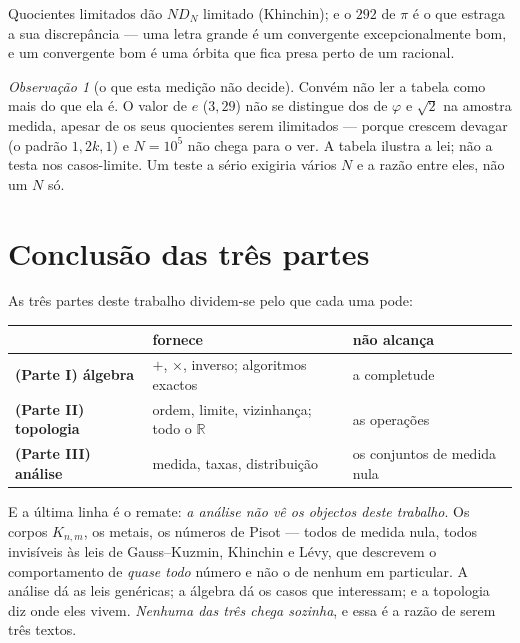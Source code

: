 \documentclass[11pt,a4paper]{article}
\theoremstyle{plain}
\theoremstyle{definition}
\theoremstyle{remark}
\newtheorem{obs}[teorema]{Observação}
\newcommand{\R}{\mathbb{R}}
\begin{document}
\noindent Quocientes limitados dão $N D_N$ limitado (Khinchin); e o $292$ de $\pi$ é o que estraga a
sua discrepância --- uma letra grande é um convergente excepcionalmente bom, e um convergente bom é
uma órbita que fica presa perto de um racional.

\begin{obs}[o que esta medição não decide]\label{obs:naodecide}
Convém não ler a tabela como mais do que ela é. O valor de $e$ ($3{,}29$) não se distingue dos de
$\varphi$ e $\sqrt2$ na amostra medida, apesar de os seus quocientes serem ilimitados --- porque
crescem devagar (o padrão $1,2k,1$) e $N=10^5$ não chega para o ver. A tabela ilustra a lei; não a
testa nos casos-limite. Um teste a sério exigiria vários $N$ e a razão entre eles, não um $N$ só.
\end{obs}

\section{Conclusão das três partes}\label{sec:conc3}

As três partes deste trabalho dividem-se pelo que cada uma pode:

\begin{center}\small
\begin{tabular}{lll}
\hline
& fornece & não alcança \\ \hline
\textbf{(Parte I) álgebra} & $+$, $\times$, inverso; algoritmos exactos & a completude \\
\textbf{(Parte II) topologia} & ordem, limite, vizinhança; todo o $\R$ & as operações \\
\textbf{(Parte III) análise} & medida, taxas, distribuição & os conjuntos de medida nula \\
\hline
\end{tabular}
\end{center}

\noindent E a última linha é o remate: \emph{a análise não vê os objectos deste trabalho}. Os
corpos $K_{n,m}$, os metais, os números de Pisot --- todos de medida nula, todos invisíveis às leis
de Gauss--Kuzmin, Khinchin e Lévy, que descrevem o comportamento de \emph{quase todo} número e não
o de nenhum em particular. A análise dá as leis genéricas; a álgebra dá os casos que interessam; e
a topologia diz onde eles vivem. \emph{Nenhuma das três chega sozinha}, e essa é a razão de serem
três textos.
\end{document}
